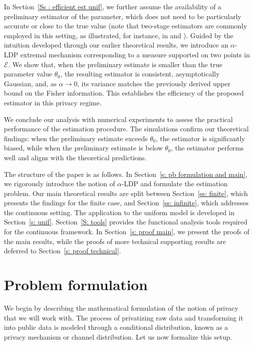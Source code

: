 \documentclass[a4paper, 11pt]{article}
\theoremstyle{definition}
\begin{document}
{In Section~\ref{Ss : efficient est unif}, we further assume the availability of a preliminary estimator of the parameter, which does not need to be particularly accurate or close to the true value (note that two-stage estimators are commonly employed in this setting, as illustrated, for instance, in \cite{KalSte} and \cite{steinbergerEfficiencyLocalDifferent}). Guided by the intuition developed through our earlier theoretical results, we introduce an \(\alpha\)-LDP extremal mechanism corresponding to a measure supported on two points in \(\mathcal{E}\). We show that, when the preliminary estimate is smaller than the true parameter value \(\theta_0\), the resulting estimator is consistent, asymptotically Gaussian, and, as \(\alpha \to 0\), its variance matches the previously derived upper bound on the Fisher information. This establishes the efficiency of the proposed estimator in this privacy regime.

We conclude our analysis with numerical experiments to assess the practical performance of the estimation procedure. The simulations confirm our theoretical findings: when the preliminary estimate exceeds \(\theta_0\), the estimator is significantly biased, while when the preliminary estimate is below \(\theta_0\), the estimator performs well and aligns with the theoretical predictions.

\vspace{0.3 cm}

The structure of the paper is as follows. In Section~\ref{s: pb formulation and main}, we rigorously introduce the notion of \(\alpha\)-LDP and formulate the estimation problem. Our main theoretical results are split between Section~\ref{ss: finite}, which presents the findings for the finite case, and Section~\ref{ss: infinite}, which addresses the  continuous setting. The application to the uniform model is developed in Section~\ref{s: unif}. Section~\ref{S: tools} provides the functional analysis tools required for the continuous framework. In Section~\ref{s: proof main}, we present the proofs of the main results, while the proofs of more technical supporting results are deferred to Section~\ref{s: proof technical}.






\section{Problem formulation}{\label{s: pb formulation and main}}
We begin by describing the mathematical formulation of the notion of privacy that we will work with. The process of privatizing raw data and transforming it into public data is modeled through a conditional distribution, known as a privacy mechanism or channel distribution. Let us now formalize this setup.

}
\end{document}
